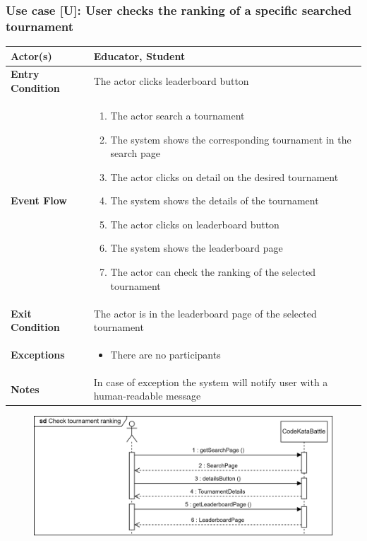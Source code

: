 \documentclass[12pt, a4paper]{report}
\newcounter{useCase}
\newcommand{\usecase}[9]{
    \def\arraystretch{1.5} 
    \subsubsection*{Use case [U#2]: #3}
    \vspace*{0.2cm}
    \begin{center}
        \begin{tabular}{|l|p{12cm}|}
            \hline
            \textbf{Actor(s)} & #4 \\
            \hline
            \textbf{Entry Condition} & #5 \\
            \hline
            \textbf{Event Flow} & #6 \\
            \hline
            \textbf{Exit Condition} & #7 \\
            \hline
            \textbf{Exceptions} & #8 \\
            \hline
            \textbf{Notes} & #9 \\
            \hline
        \end{tabular}
    \end{center}
    #1
}
\begin{document}
    \usecase{\begin{figure}[H]\centering\includegraphics[width=0.9\linewidth]{images/checktournamentranking1.png}\end{figure}}        
    {\arabic{useCase}\stepcounter{useCase}}
    {User checks the ranking of a specific searched tournament}
    {Educator, Student}
    {The actor clicks leaderboard button}
    {
    \begin{enumerate}
        \item The actor search a tournament
        \item The system shows the corresponding tournament in the search page
        \item The actor clicks on detail on the desired tournament
        \item The system shows the details of the tournament 
        \item The actor clicks on leaderboard button
        \item The system shows the leaderboard page
        \item The actor can check the ranking of the selected tournament
    \end{enumerate}
    }
    {The actor is in the leaderboard page of the selected tournament}
    {
    \begin{itemize}
        \item There are no participants
    \end{itemize}
    }
    {In case of exception the system will notify user with a human-readable message}
\end{document}
